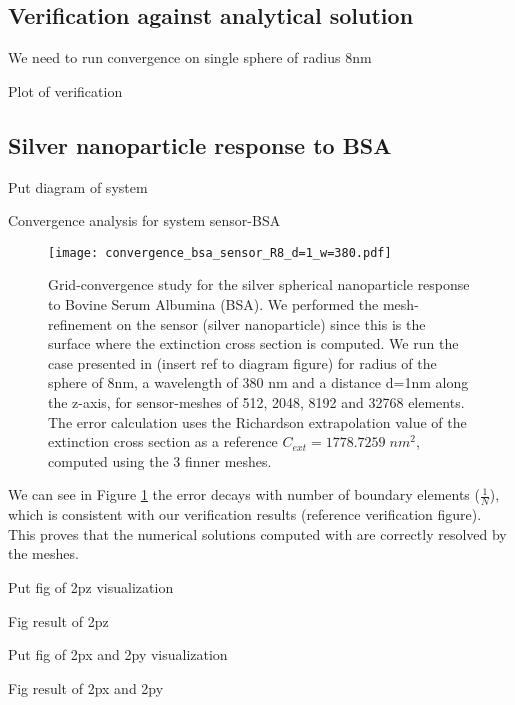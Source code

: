 
\subsection{Verification against analytical solution} \label{sec:verification}

We need to run convergence on single sphere of radius 8nm

Plot of verification

\subsection{Silver nanoparticle response to BSA} \label{sec:verification}

Put diagram of system

Convergence analysis for system sensor-BSA


\begin{figure}[h] %
   \centering
   \texttt{[image: convergence\_bsa\_sensor\_R8\_d=1\_w=380.pdf]} 
   \caption{Grid-convergence study for the silver spherical nanoparticle response to Bovine Serum Albumina (BSA). We performed
            the mesh-refinement on the sensor (silver nanoparticle) since this is the surface where the extinction cross section 
            is computed. We run the case presented in (insert ref to diagram figure) for radius of the sphere of 8nm, a wavelength
            of  380 nm and a distance d=1nm along the z-axis, for sensor-meshes of 512, 2048, 8192 and 32768 elements. The error 
            calculation uses the Richardson extrapolation value of the extinction cross section as a reference $C_{ext} = 1778.7259 \; nm^2$, 
            computed using the 3 finner meshes.}
   \label{fig:error_sphere-bsa}
\end{figure}


We can see in Figure \ref{fig:error_sphere-bsa} the error decays with number of boundary elements ($\frac{1}{N}$), which is consistent with our verification 
results (reference verification figure). This proves that the numerical solutions computed with \pygbe are correctly resolved by the meshes. 


Put fig of 2pz visualization

Fig result of 2pz

Put fig of 2px and 2py visualization

Fig result of 2px and 2py


